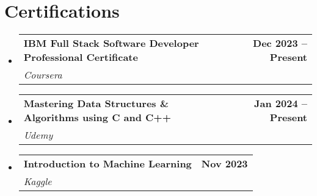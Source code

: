 \documentclass[a4,11pt]{article}
\makeatletter
\newcommand{\resumeSubheading}[4]{
  \vspace{-2pt}\item
    \begin{tabular*}{1.0\textwidth}[t]{l@{\extracolsep{\fill}}r}
      \textbf{#1} & \textbf{\small #2} \\
      \textit{\small#3} & \textit{\small #4} \\
    \end{tabular*}\vspace{-7pt}
}
\newcommand{\resumeSubHeadingListStart}{\begin{itemize}[leftmargin=0.0in, label={}]}
\newcommand{\resumeSubHeadingListEnd}{\end{itemize}}
\makeatother
\begin{document}
\section{Certifications}
    \resumeSubHeadingListStart
        \resumeSubheading{IBM Full Stack Software Developer Professional Certificate}{Dec 2023 -- Present}{Coursera}{}
        \resumeSubheading{Mastering Data Structures \& Algorithms using C and C++}{Jan 2024 -- Present}{Udemy}{}
        \resumeSubheading{Introduction to Machine Learning}{Nov 2023}{Kaggle}{}
    \resumeSubHeadingListEnd
\end{document}
